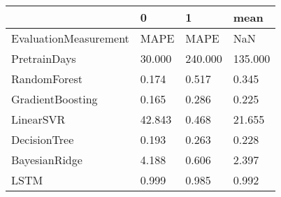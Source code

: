 \begin{tabular}{llll}
\toprule
{} &       0 &        1 &     mean \\
\midrule
EvaluationMeasurement &    MAPE &     MAPE &      NaN \\
PretrainDays          &  30.000 &  240.000 &  135.000 \\
RandomForest          &   0.174 &    0.517 &    0.345 \\
GradientBoosting      &   0.165 &    0.286 &    0.225 \\
LinearSVR             &  42.843 &    0.468 &   21.655 \\
DecisionTree          &   0.193 &    0.263 &    0.228 \\
BayesianRidge         &   4.188 &    0.606 &    2.397 \\
LSTM                  &   0.999 &    0.985 &    0.992 \\
\bottomrule
\end{tabular}
